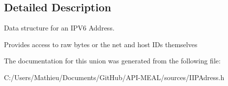 \subsection{Detailed Description}
Data structure for an I\+P\+V6 Address. 

Provides access to raw bytes or the net and host I\+Ds themselves 

The documentation for this union was generated from the following file\+:\begin{DoxyCompactItemize}
\item 
C\+:/\+Users/\+Mathieu/\+Documents/\+Git\+Hub/\+A\+P\+I-\/\+M\+E\+A\+L/sources/I\+I\+P\+Adress.\+h\end{DoxyCompactItemize}
